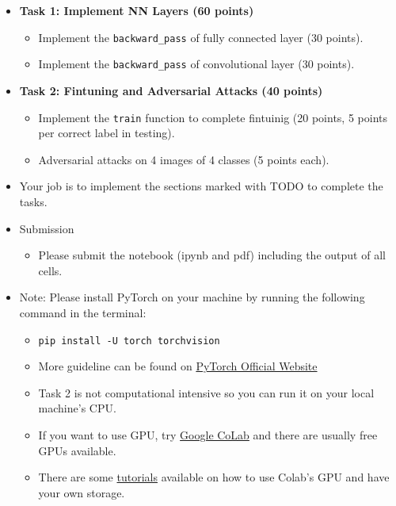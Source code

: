 \documentclass[11pt]{article}
\providecommand{\tightlist}{%
      \setlength{\itemsep}{0pt}\setlength{\parskip}{0pt}}
\begin{document}
\begin{itemize}
\item
  \textbf{Task 1: Implement NN Layers (60 points)}

  \begin{itemize}
  \tightlist
  \item
    Implement the \texttt{backward\_pass} of fully connected layer (30
    points).
  \item
    Implement the \texttt{backward\_pass} of convolutional layer (30
    points).
  \end{itemize}
\item
  \textbf{Task 2: Fintuning and Adversarial Attacks (40 points)}

  \begin{itemize}
  \tightlist
  \item
    Implement the \texttt{train} function to complete fintuinig (20
    points, 5 points per correct label in testing).
  \item
    Adversarial attacks on 4 images of 4 classes (5 points each).
  \end{itemize}
\item
  Your job is to implement the sections marked with TODO to complete the
  tasks.
\item
  Submission

  \begin{itemize}
  \tightlist
  \item
    Please submit the notebook (ipynb and pdf) including the output of
    all cells.
  \end{itemize}
\item
  Note: Please install PyTorch on your machine by running the following
  command in the terminal:

  \begin{itemize}
  \tightlist
  \item
    \texttt{pip\ install\ -U\ torch\ torchvision}
  \item
    More guideline can be found on
    \href{https://pytorch.org/get-started/locally/}{PyTorch Official
    Website}
  \item
    Task 2 is not computational intensive so you can run it on your
    local machine's CPU.
  \item
    If you want to use GPU, try
    \href{https://colab.research.google.com/}{Google CoLab} and there
    are usually free GPUs available.
  \item
    There are some
    \href{https://towardsdatascience.com/getting-started-with-google-colab-f2fff97f594c}{tutorials}
    available on how to use Colab's GPU and have your own storage.
  \end{itemize}
\end{itemize}
\end{document}
